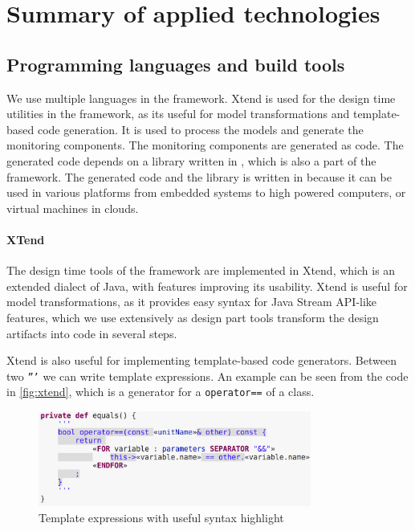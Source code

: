 \chapter{Summary of applied technologies}

\section{Programming languages and build tools}

We use multiple languages in the framework. 
Xtend is used for the design time utilities in the framework, as its useful for model transformations and template-based code generation.
It is used to process the models and generate the monitoring components. 
The monitoring components are generated as \cpp{} code.
The generated code depends on a library written in \cpp{}, which is also a part of the framework.
The generated code and the library is written in \cpp{} because it can be used in various platforms from embedded systems to high powered computers, or virtual machines in clouds.


\subsubsection{XTend}
The design time tools of the framework are implemented in Xtend\cite{xtend}, which is an extended dialect of Java, with features improving its usability.
Xtend is useful for model transformations, as it provides easy syntax for Java Stream API-like features, which we use extensively as design part tools transform the design artifacts into code in several steps.

Xtend is also useful for implementing template-based code generators. 
Between two \texttt{'''} we can write template expressions.
An example can be seen from the code in \autoref{fig:xtend}, which is a generator for a \cpp{} \texttt{operator==} of a class.


\begin{figure}[H]
	\begin{center}
		\includegraphics[width=0.8\textwidth]{figures/xtend.png}
		\caption{Template expressions with useful syntax highlight }
		\label{fig:xtend}
	\end{center}
\end{figure}

